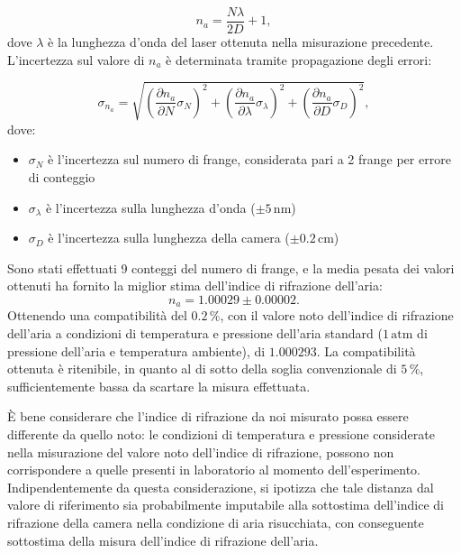 \documentclass[a4paper,12pt]{article}
\begin{document}
\begin{equation}
n_a = \frac{N\lambda}{2D} + 1,
\label{eq:indice_rifrazione}
\end{equation}
dove \( \lambda \) è la lunghezza d’onda del laser ottenuta nella misurazione precedente.
L’incertezza sul valore di \( n_a \) è determinata tramite propagazione degli errori:

\begin{equation}
\sigma_{n_a} = \sqrt{\left(\frac{\partial n_a}{\partial N} \sigma_N\right)^2 + \left(\frac{\partial n_a}{\partial \lambda} \sigma_\lambda\right)^2 + \left(\frac{\partial n_a}{\partial D} \sigma_D\right)^2},
\label{eq:incertezza_indice}
\end{equation}
dove:
\begin{itemize}
    \item \( \sigma_N \) è l’incertezza sul numero di frange, considerata pari a 2 frange per errore di conteggio
    \item \( \sigma_\lambda \) è l’incertezza sulla lunghezza d’onda (\( \pm 5 \, \text{nm} \))
    \item \( \sigma_D \) è l’incertezza sulla lunghezza della camera (\( \pm 0.2 \, \text{cm} \))
\end{itemize}
Sono stati effettuati 9 conteggi del numero di frange, e la media pesata dei valori ottenuti ha fornito la miglior stima dell’indice di rifrazione dell’aria:
\begin{equation}
n_a = 1.00029 \pm 0.00002.
\label{eq:valore_na}
\end{equation}
Ottenendo una compatibilità del \( 0.2 \, \% \), con il valore noto dell’indice di rifrazione dell’aria a condizioni di temperatura e pressione dell’aria standard (\( 1 \, \text{atm} \) di pressione dell’aria e temperatura ambiente), di \( 1.000293 \). La compatibilità ottenuta è ritenibile, in quanto al di sotto della soglia convenzionale di \( 5 \, \% \), sufficientemente bassa da scartare la misura effettuata. 


È bene considerare che l'indice di rifrazione da noi misurato possa essere differente da quello noto: le condizioni di temperatura e pressione considerate nella misurazione del valore noto dell'indice di rifrazione, possono non corrispondere a quelle presenti in laboratorio al momento dell'esperimento.
Indipendentemente da questa considerazione, si ipotizza che tale distanza dal valore di riferimento sia probabilmente imputabile alla sottostima dell’indice di rifrazione della camera nella condizione di aria risucchiata, con conseguente sottostima della misura dell’indice di rifrazione dell’aria. 
\end{document}
